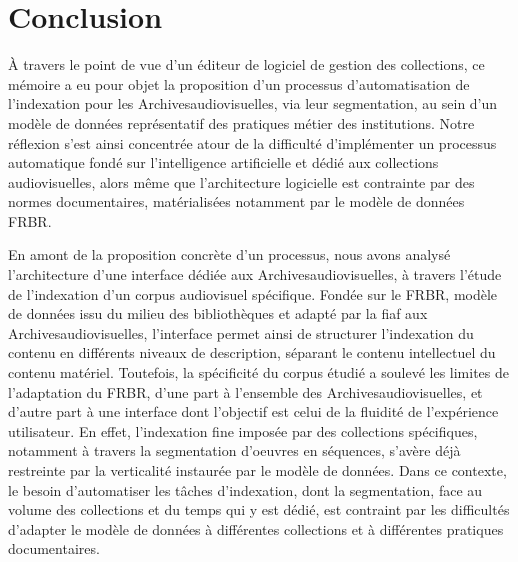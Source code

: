 \chapter*{Conclusion}



À travers le point de vue d'un éditeur de logiciel de gestion des collections, ce mémoire a eu pour objet la proposition d'un processus d'automatisation de l'indexation pour les \gls{Archivesaudiovisuelles}, via leur segmentation, au sein d'un modèle de données représentatif des pratiques métier des institutions. Notre réflexion s'est ainsi concentrée atour de la difficulté d'implémenter un processus automatique fondé sur l'intelligence artificielle et dédié aux collections audiovisuelles, alors même que l'architecture logicielle est contrainte par des normes documentaires, matérialisées notamment par le modèle de données \gls{FRBR}. 

En amont de la proposition concrète d'un processus, nous avons analysé l'architecture d'une interface dédiée aux \gls{Archivesaudiovisuelles}, à travers l'étude de l'indexation d'un corpus audiovisuel spécifique. Fondée sur le \gls{FRBR}, modèle de données issu du milieu des bibliothèques et adapté par la \gls{fiaf} aux \gls{Archivesaudiovisuelles}, l'interface permet ainsi de structurer l'indexation du contenu en différents niveaux de description, séparant le contenu intellectuel du contenu matériel. Toutefois, la spécificité du corpus étudié a soulevé les limites de l'adaptation du \gls{FRBR}, d'une part à l'ensemble des \gls{Archivesaudiovisuelles}, et d'autre part à une interface dont l'objectif est celui de la fluidité de l'expérience utilisateur. En effet, l'indexation fine imposée par des collections spécifiques, notamment à travers la segmentation d'oeuvres en séquences, s'avère déjà restreinte par la verticalité instaurée par le modèle de données. Dans ce contexte, le besoin d'automatiser les tâches d'indexation, dont la segmentation, face au volume des collections et du temps qui y est dédié, est contraint par les difficultés d'adapter le modèle de données à différentes collections et à différentes pratiques documentaires. 

